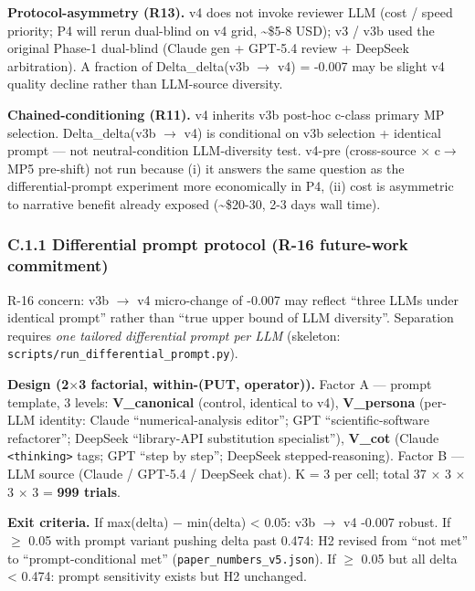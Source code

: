 \documentclass[review,12pt,authoryear]{elsarticle}
\begin{document}
\textbf{Protocol-asymmetry (R13).} v4 does not invoke reviewer LLM (cost
/ speed priority; P4 will rerun dual-blind on v4 grid,
\textasciitilde\$5-8 USD); v3 / v3b used the original Phase-1 dual-blind
(Claude gen + GPT-5.4 review + DeepSeek arbitration). A fraction of
Delta\_delta(v3b $\to$ v4) = -0.007 may be slight v4 quality decline rather
than LLM-source diversity.

\textbf{Chained-conditioning (R11).} v4 inherits v3b post-hoc c-class
primary MP selection. Delta\_delta(v3b $\to$ v4) is conditional on v3b
selection + identical prompt --- not neutral-condition LLM-diversity
test. v4-pre (cross-source $\times$ c$\to$MP5 pre-shift) not run because (i) it
answers the same question as the differential-prompt experiment more
economically in P4, (ii) cost is asymmetric to narrative benefit already
exposed (\textasciitilde\$20-30, 2-3 days wall time).

\subsubsection{C.1.1 Differential prompt protocol (R-16 future-work
commitment)}\label{c.1.1-differential-prompt-protocol-r-16-future-work-commitment}

R-16 concern: v3b $\to$ v4 micro-change of -0.007 may reflect ``three LLMs
under identical prompt'' rather than ``true upper bound of LLM
diversity''. Separation requires \emph{one tailored differential prompt
per LLM} (skeleton: \texttt{scripts/run\_differential\_prompt.py}).

\textbf{Design (2$\times$3 factorial, within-(PUT, operator)).} Factor A ---
prompt template, 3 levels: \textbf{V\_canonical} (control, identical to
v4), \textbf{V\_persona} (per-LLM identity: Claude ``numerical-analysis
editor''; GPT ``scientific-software refactorer''; DeepSeek ``library-API
substitution specialist''), \textbf{V\_cot} (Claude
\texttt{\textless{}thinking\textgreater{}} tags; GPT ``step by step'';
DeepSeek stepped-reasoning). Factor B --- LLM source (Claude / GPT-5.4 /
DeepSeek chat). K = 3 per cell; total 37 $\times$ 3 $\times$ 3 $\times$ 3 = \textbf{999
trials}.

\textbf{Exit criteria.} If max(delta) − min(delta) \textless{} 0.05: v3b
$\to$ v4 -0.007 robust. If $\geq$ 0.05 with prompt variant pushing delta past
0.474: H2 revised from ``not met'' to ``prompt-conditional met''
(\texttt{paper\_numbers\_v5.json}). If $\geq$ 0.05 but all delta \textless{}
0.474: prompt sensitivity exists but H2 unchanged.
\end{document}

